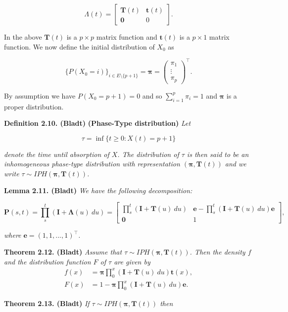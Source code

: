 \documentclass[a4paper,12pt,openany]{book}
\begin{document}
\[
\Lambda(t)=\begin{bmatrix}
\mathbf{T}(t) & \mathbf{t}(t)\\
\mathbf{0} & 0
\end{bmatrix}.
\]

In the above \(\mathbf{T}(t)\) is a \(p\times p\) matrix function and \(\mathbf{t}(t)\) is a \(p\times 1\) matrix function. We now define the initial distribution of \(X_0\) as

\[
\{P(X_0=i)\}_{i\in E\setminus \{p+1\}}=\mathbf{\pi}=\begin{pmatrix}\pi_1\\ \vdots\\ \pi_p\end{pmatrix}^\top.
\]

By assumption we have \(P(X_0=p+1)=0\) and so \(\sum_{i=1}^p\pi_i=1\) and \(\mathbf{\pi}\) is a proper distribution.

\textbf{Definition 2.10. (Bladt)} \textbf{(Phase-Type distribution)} \emph{Let}

\[
\tau = \inf\{t\ge 0 : X(t)=p+1\}
\]

\emph{denote the time until absorption of \(X\). The distribution of \(\tau\) is then said to be an inhomogeneous phase-type distribution with representation \((\mathbf{\pi},\mathbf{T}(t))\) and we write \(\tau \sim IPH(\mathbf{\pi},\mathbf{T}(t))\).}

\textbf{Lemma 2.11. (Bladt)} \emph{We have the following decomposition:}

\[
\mathbf{P}(s,t)=\prod_s^t(\mathbf{I}+\mathbf{\Lambda}(u)\ du)=
\begin{bmatrix}
\prod_s^t(\mathbf{I}+\mathbf{T}(u)\ du) & \mathbf{e} -\prod_s^t(\mathbf{I}+\mathbf{T}(u)\ du)\mathbf{e}\\
\mathbf{0} & 1
\end{bmatrix},
\]

\emph{where \(\mathbf{e}=(1,1,...,1)^\top\).}

\textbf{Theorem 2.12. (Bladt)} \emph{Assume that \(\tau \sim IPH(\mathbf{\pi},\mathbf{T}(t))\). Then the density \(f\) and the distribution function \(F\) of \(\tau\) are given by}
\begin{align*}
f(x)&=\mathbf{\pi}\prod_0^x(\mathbf{I}+\mathbf{T}(u)\ du)\mathbf{t}(x),\\
F(x)&=1-\mathbf{\pi}\prod_0^x(\mathbf{I}+\mathbf{T}(u)\ du)\mathbf{e}.
\end{align*}

\textbf{Theorem 2.13. (Bladt)} \emph{If \(\tau \sim IPH(\mathbf{\pi},\mathbf{T}(t))\) then}
\end{document}

